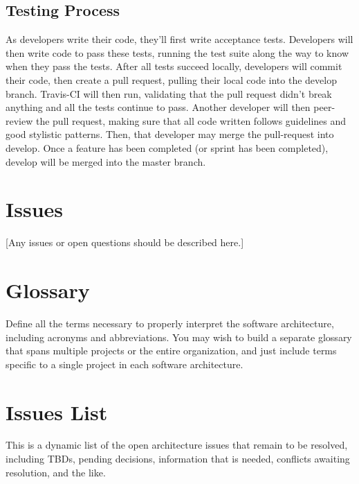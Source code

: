 \documentclass[12pt,oneside,letterpaper]{article}
\begin{document}
\subsection{Testing Process}
As developers write their code, they'll first write acceptance tests. Developers will then write code to pass these tests, running the test suite along the way to know when they pass the tests. After all tests succeed locally, developers will commit their code, then create a pull request, pulling their local code into the develop branch. Travis-CI will then run, validating that the pull request didn't break anything and all the tests continue to pass. Another developer will then peer-review the pull request, making sure that all code written follows guidelines and good stylistic patterns. Then, that developer may merge the pull-request into develop. Once a feature has been completed (or sprint has been completed), develop will be merged into the master branch.

\section{Issues}
[Any issues or open questions should be described here.]

\appendix
\section{Glossary}
Define all the terms necessary to properly interpret the software architecture, including acronyms and abbreviations. You may wish to build a separate glossary that spans multiple projects or the entire organization, and just include terms specific to a single project in each software architecture.

\section{Issues List}
This is a dynamic list of the open architecture issues that remain to be resolved, including TBDs, pending decisions, information that is needed, conflicts awaiting resolution, and the like.
\end{document}
